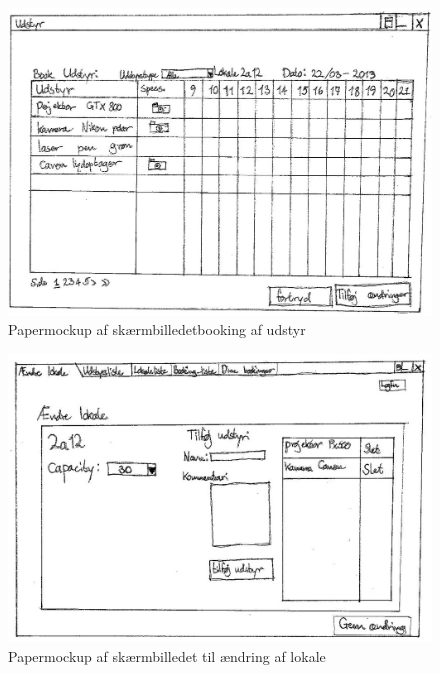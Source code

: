 \begin{figure}[h!]
  \centering
    \includegraphics[angle=90, height=0.9\textheight]{Appendix/GUI-Prototype/PaperMockup/BookUdstyr_001}
  \caption{Papermockup af  skærmbilledetbooking af udstyr}
\label{App_GUI_paper_BookUdstyr}
\end{figure}

\begin{figure}[h!]
  \centering
    \includegraphics[angle=90, height=0.9\textheight]{Appendix/GUI-Prototype/PaperMockup/AendreLokale_001}
  \caption{Papermockup  af skærmbilledet til ændring af lokale}
\label{App_GUI_paper_AendreLokale}
\end{figure}


